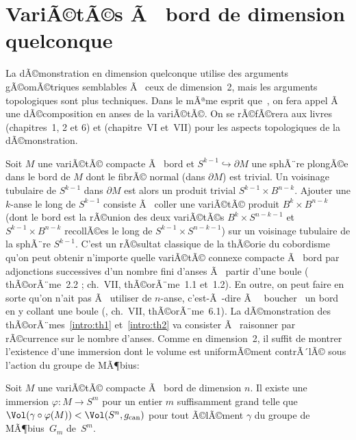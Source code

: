 \documentclass[11pt,a4paper]{smfart}
\begin{document}
\section{VariÃ©tÃ©s Ã  bord de dimension quelconque}\label{n}
La dÃ©monstration en dimension quelconque utilise des arguments gÃ©omÃ©triques
semblables Ã  ceux de dimension~2, mais les arguments topologiques sont plus
techniques. Dans le mÃªme esprit que~\cite{ja08}, on fera appel Ã  une
dÃ©composition en anses de la variÃ©tÃ©. On se rÃ©fÃ©rera aux livres \cite{ra02}
(chapitres~1, 2 et 6) et \cite{ko07} (chapitre~VI et~VII) pour les
aspects topologiques de la dÃ©monstration.

Soit $M$ une variÃ©tÃ© compacte Ã  bord et $S^{k-1}\hookrightarrow\partial M$
une sphÃ¨re plongÃ©e dans le bord de $M$ dont le fibrÃ© normal (dans
$\partial M$) est trivial. Un voisinage tubulaire de $S^{k-1}$ dans
$\partial M$ est alors un produit trivial $S^{k-1}\times B^{n-k}$.
Ajouter une $k$-anse le long de $S^{k-1}$ consiste Ã  coller une variÃ©tÃ©
produit $B^k\times B^{n-k}$ (dont le bord est la rÃ©union des deux variÃ©tÃ©s
$B^k\times S^{n-k-1}$ et $S^{k-1}\times B^{n-k}$ recollÃ©es le long
de $S^{k-1}\times S^{n-k-1}$)  sur un voisinage tubulaire
de la sphÃ¨re $S^{k-1}$. C'est un rÃ©sultat classique de la thÃ©orie du
cobordisme qu'on peut obtenir n'importe quelle variÃ©tÃ© connexe compacte
Ã  bord par adjonctions successives d'un nombre fini d'anses Ã  partir d'une
boule (\cite{ra02} thÃ©orÃ¨me~2.2 ; \cite{ko07} ch.~VII, thÃ©orÃ¨me~1.1 et~1.2).
En outre, on peut
faire en sorte qu'on n'ait pas Ã 
utiliser de $n$-anse, c'est-Ã -dire Ã  \og{}~boucher~\fg{} un bord en y collant
une boule (\cite{ko07}, ch.~VII, thÃ©orÃ¨me~6.1). La dÃ©monstration des
thÃ©orÃ¨mes~\ref{intro:th1} et~\ref{intro:th2} va
consister Ã  raisonner par rÃ©currence sur le nombre d'anses.
Comme en dimension~2, il suffit de montrer l'existence d'une immersion
dont le volume est uniformÃ©ment contrÃ´lÃ© sous l'action du groupe de
MÃ¶bius:
\begin{theo}\label{n:th}
Soit $M$ une variÃ©tÃ© compacte Ã  bord de dimension $n$. Il existe une
immersion $\varphi:M\to S^m$ pour un entier $m$ suffisamment grand telle
que $\Vol(\gamma\circ\varphi(M))<\Vol(S^n,g_{\textrm{can}})$ pour tout
Ã©lÃ©ment $\gamma$ du groupe de MÃ¶bius~$G_m$ de~$S^m$.
\end{theo}
\end{document}
